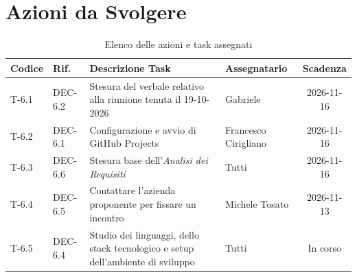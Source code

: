 \documentclass[11pt, a4paper]{article}
\begin{document}
\section{Azioni da Svolgere}

\begin{table}[htbp]
\centering
\caption{Elenco delle azioni e task assegnati}
\label{tab:azioni}
\begin{tabularx}{\textwidth}{l l X l c}
\toprule
\textbf{Codice} & \textbf{Rif.} & \textbf{Descrizione Task} & \textbf{Assegnatario} & \textbf{Scadenza} \\
\midrule
T-6.1 & DEC-6.2 & Stesura del verbale relativo alla riunione tenuta il 19-10-2026 & Gabriele & 2026-11-16 \\
T-6.2 & DEC-6.1 & Configurazione e avvio di GitHub Projects & Francesco Cirigliano  & 2026-11-16 \\
T-6.3 & DEC-6.6 & Stesura base dell'\textit{Analisi dei Requisiti} & Tutti & 2026-11-16 \\
T-6.4 & DEC-6.5 & Contattare l'azienda proponente per fissare un incontro & Michele Tosato & 2026-11-13 \\
T-6.5 & DEC-6.4 & Studio dei linguaggi, dello stack tecnologico e setup dell'ambiente di sviluppo & Tutti & In corso \\
\bottomrule
\end{tabularx}
\end{table}
\end{document}
